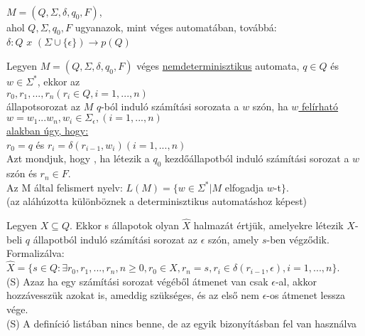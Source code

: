 \begin{frame}
\begin{tcolorbox}[title={Def.: Nemdeterminisztikus automata}]
\\
\mmedskip
$M = (Q, {\Sigma}, {\delta}, q_0, F)$,\\
\mmedskip
ahol $Q, {\Sigma}, q_0, F$ ugyanazok, mint véges automatában, továbbá:\\
\mmedskip
$\delta : Q$ $x$ $({\Sigma} \cup \{{\epsilon}\}) \rightarrow p(Q)$
\end{tcolorbox}

\begin{tcolorbox}[title={squeezed Def.: Számítási sorozat, elfogadott szó, felismert nyelv}]
Legyen $M = (Q, {\Sigma}, {\delta}, q_0, F)$ véges \underline{nemdeterminisztikus} automata, $q \in Q$ és \underline{$w \in {\Sigma}^*$}, ekkor az\\
\mmedskip
$r_0, r_1, ..., r_n (r_i \in Q, i = 1, ..., n)$\\
\mmedskip
állapotsorozat az $M$ $q$-ból induló számítási sorozata a $w$ szón, ha \underline{$w$ felírható}\\
\mmedskip
\underline{$w = w_1 ... w_n, w_i \in {\Sigma}_{\epsilon}, (i = 1, ..., n)$}\\
\mmedskip
\underline{alakban úgy, hogy:}\\
\mmedskip
$r_0 = q$ és $r_i = {\delta}(r_{i - 1}, w_i)(i = 1, ..., n)$\\
\mbigskip
{} Azt mondjuk, hogy , ha létezik a $q_0$ kezdőállapotból induló számítási sorozat a $w$ szón és $r_n \in F$.\\
\mbigskip
{} Az M által felismert nyelv: $L(M) = \{w \in {\Sigma}^* | M$ elfogadja $w$-t$\}$.\\
\mbigskip
(az aláhúzotta különböznek a determinisztikus automatáshoz képest)
\end{tcolorbox}

\begin{tcolorbox}[title={Def.: $X \epsilon$-lezártja}]
Legyen $X \subseteq Q$. Ekkor  s állapotok olyan $\widehat{X}$ halmazát értjük, amelyekre létezik $X$-beli $q$ állapotból induló számítási sorozat az $\epsilon$ szón, amely $s$-ben végződik.\\
Formalizálva:\\
$\widehat{X} = \{s \in Q : {\exists}r_0,r_1,...,r_n, n \geq 0, r_0 \in X, r_n = s, r_i \in {\delta}(r_{i - 1}, {\epsilon}), i = 1, ..., n\}$.\\
{\tiny (S) Azaz ha egy számítási sorozat végéből átmenet van csak $\epsilon$-al, akkor hozzávesszük azokat is, ameddig szükséges, és az első nem $\epsilon$-os átmenet lessza vége.}\\
{\tiny (S) A definíció listában nincs benne, de az egyik bizonyításban fel van használva}
\end{tcolorbox}
\end{frame}

